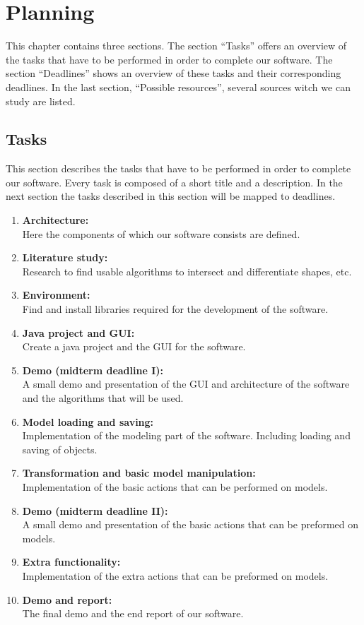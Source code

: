 \documentclass[10pt]{report}
\begin{document}
%
%
\chapter{Planning}\label{chap:planning}
This chapter contains three sections. The section ``Tasks'' offers an overview of the tasks that have to be performed in order to complete our software. The section ``Deadlines'' shows an overview of these tasks and their corresponding deadlines. In the last section, ``Possible resources'', several sources witch we can study are listed.

\section{Tasks}
This section describes the tasks that have to be performed in order to complete our software. Every task is composed of a short title and a description. In the next section the tasks described in this section will be mapped to deadlines.\\

\begin{enumerate}
	\item \textbf{Architecture:}\\
		Here the components of which our software consists are defined.
	\item \textbf{Literature study:}\\
		Research to find usable algorithms to intersect and differentiate shapes, etc.
	\item \textbf{Environment:}\\
		Find and install libraries required for the development of the software.
	\item \textbf{Java project and GUI:}\\
		Create a java project and the GUI for the software.
	\item \textbf{Demo (midterm deadline I):}\\
		A small demo and presentation of the GUI and architecture of the software and the algorithms that will be used.
	\item \textbf{Model loading and saving:}\\
		Implementation of the modeling part of the software. Including loading and saving of objects.
	\item \textbf{Transformation and basic model manipulation:}\\
		Implementation of the basic actions that can be performed on models.
	\item \textbf{Demo (midterm deadline II):}\\
		A small demo and presentation of the basic actions that can be preformed on models.
	\item \textbf{Extra functionality:}\\
		Implementation of the extra actions that can be preformed on models.
	\item \textbf{Demo and report:}\\
		The final demo and the end report of our software.
\end{enumerate}
\end{document}
